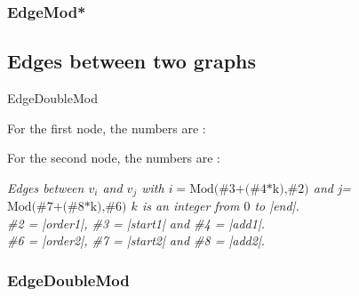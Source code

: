 \subsubsection{EdgeMod* }%
\begin{center}
\begin{tkzexample}[vbox]
\end{tkzexample}
\end{center}

\newpage
\subsection{Edges between two graphs }%
\begin{NewMacroBox}{EdgeDoubleMod}{}

For the first node,  the numbers are :

\medskip
For the second node,  the numbers are :

\medskip
\emph{Edges between $v_i$ and $v_j$ with $i=\text{Mod(\#3+(\#4*k),\#2)}$ and j=$\text{Mod(\#7+(\#8*k),\#6)}$ $k$ is an integer from $0$ to |end|.\\
\#2 = |order1|,  \#3 = |start1| and \#4 = |add1|.\\
\#6 = |order2|,  \#7 = |start2| and \#8 = |add2|.}
\end{NewMacroBox}


\subsubsection{EdgeDoubleMod}
\begin{center}
\begin{tkzexample}[vbox]
\end{tkzexample}
\end{center}


